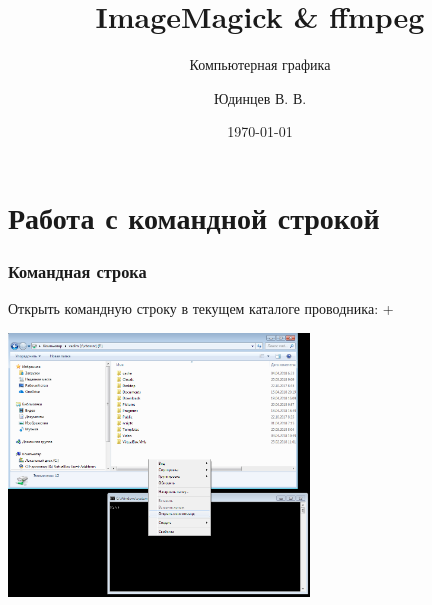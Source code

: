 \documentclass[11pt, compress]{beamer}
\title{ImageMagick \& ffmpeg}
\subtitle{Компьютерная графика}
\author[Самарский университет]{Юдинцев В. В.}
\institute{Кафедра теоретической механики}
\date{\today}
\begin{document}
{
\begin{frame}[plain]
\maketitle
\end{frame}
}


\section{Работа с командной строкой}

\begin{frame}[c, fragile]
\frametitle{Командная строка}
Открыть командную строку в текущем каталоге проводника: +  
\begin{center}
\includegraphics[width=0.6\textwidth]{cmd.png}
\end{center}
\end{frame} 
\end{document}
